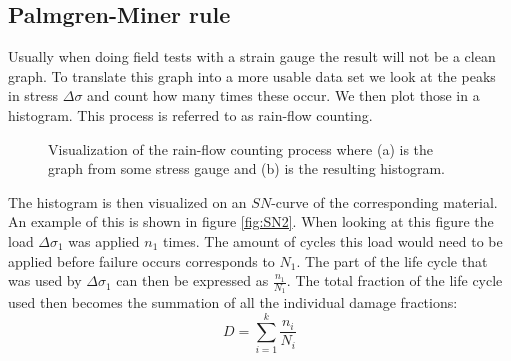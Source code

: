 \documentclass[11pt, a4paper]{article}
\begin{document}
\subsection{Palmgren-Miner rule}
Usually when doing field tests with a strain gauge the result will not be a clean graph. To translate this graph into a more usable data set we look at the peaks in stress $\Delta \sigma$ and count how many times these occur. We then plot those in a histogram. This process is referred to as rain-flow counting.
\begin{figure}[h]
  \centering
  \qquad \qquad
  \caption{Visualization of the rain-flow counting process where (a) is the graph from some stress gauge and (b) is the resulting histogram.}
  \label{fig:RFC}
\end{figure}
The histogram is then visualized on an $SN$-curve of the corresponding material. An example of this is shown in figure \ref{fig:SN2}. When looking at this figure the load $\Delta \sigma_1$ was applied $n_1$ times. The amount of cycles this load would need to be applied before failure occurs corresponds to $N_1$. The part of the life cycle that was used by $\Delta \sigma_1$ can then be expressed as $\frac{n_1}{N_1}$. The total fraction of the life cycle used then becomes the summation of all the individual damage fractions:
\begin{equation}
  D = \sum_{i=1}^{k} \frac{n_i}{N_i}
\end{equation}
\end{document}
